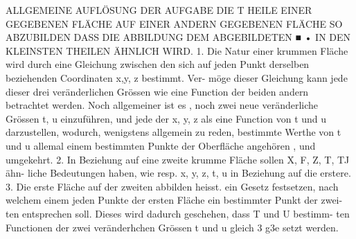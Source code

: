 \documentclass[12pt,a4paper]{article}
\begin{document}
ALLGEMEINE AUFLÖSUNG DER AUFGABE
DIE T HEILE EINER GEGEBENEN FLÄCHE
AUF EINER ANDERN GEGEBENEN FLÄCHE SO ABZUBILDEN
DASS DIE ABBILDUNG DEM ABGEBILDETEN ■ •
IN DEN KLEINSTEN THEILEN ÄHNLICH WIRD.
1.
Die Natur einer krummen Fläche wird durch eine Gleichung zwischen den
sich auf jeden Punkt derselben beziehenden Coordinaten x,y, z bestimmt. Ver-
möge dieser Gleichung kann jede dieser drei veränderlichen Grössen wie eine
Function der beiden andern betrachtet werden. Noch allgemeiner ist es , noch
zwei neue veränderliche Grössen t, u einzuführen, und jede der x, y, z als eine
Function von t und u darzustellen, wodurch, wenigstens allgemein zu reden,
bestimmte Werthe von t und u allemal einem bestimmten Punkte der Oberfläche
angehören , und umgekehrt.
2.
In Beziehung auf eine zweite krumme Fläche sollen X, F, Z, T, TJ ähn-
liche Bedeutungen haben, wie resp. x, y, z, t, u in Beziehung auf die erstere.
3.
Die erste Fläche auf der zweiten abbilden heisst. ein Gesetz festsetzen, nach
welchem einem jeden Punkte der ersten Fläche ein bestimmter Punkt der zwei-
ten entsprechen soll. Dieses wird dadurch geschehen, dass T und U bestimm-
ten Functionen der zwei veränderhchen Grössen t und u gleich 3 g3e setzt werden.
\end{document}
